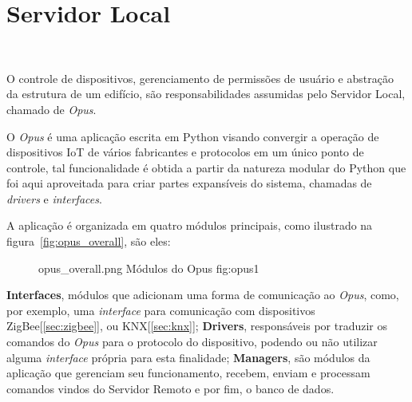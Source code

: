 \section{\textbf{Servidor Local}}
~\label{opus}

O controle de dispositivos, gerenciamento de permissões de usuário e abstração da estrutura de um edifício,
são responsabilidades assumidas pelo Servidor Local, chamado de \emph{Opus}.

O \emph{Opus} é uma aplicação escrita em Python visando convergir a operação de dispositivos IoT de vários
fabricantes e protocolos em um único ponto de controle, tal funcionalidade é obtida a partir da natureza modular
do Python que foi aqui aproveitada para criar partes expansíveis do sistema, chamadas de \emph{drivers} e \emph{interfaces}.

A aplicação é organizada em quatro módulos principais, como ilustrado na figura~\ref{fig:opus_overall}, são eles:
\begin{figure}[h!]
    {opus_overall.png}
    {Módulos do Opus}
    {fig:opus1}
\end{figure}

\textbf{Interfaces}, módulos que adicionam uma forma de comunicação ao \emph{Opus}, como, por exemplo, 
uma \emph{interface} para comunicação com dispositivos ZigBee[\ref{sec:zigbee}], ou KNX[\ref{sec:knx}]; 
\textbf{Drivers}, responsáveis por traduzir os comandos do \emph{Opus} para o protocolo do dispositivo, 
podendo ou não utilizar alguma \emph{interface} própria para esta finalidade; \textbf{Managers}, são módulos da aplicação 
que gerenciam seu funcionamento, recebem, enviam e processam comandos vindos do Servidor Remoto e por fim, o banco de dados.












